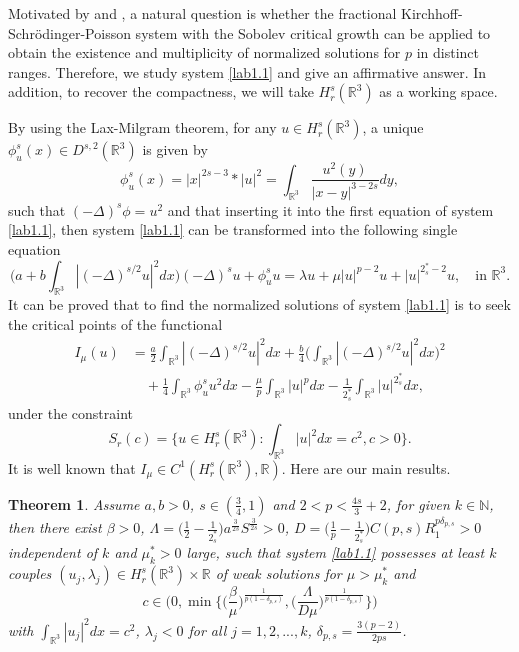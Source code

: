 \documentclass[10pt,a4paper]{amsart}
\numberwithin{equation}{section}
\newtheorem{theorem}{Theorem}[section]
\begin{document}
Motivated by \cite{H2588} and \cite{wang1388}, a natural question is whether the
fractional Kirchhoff-Schr\"odinger-Poisson system with the Sobolev critical growth can
be applied to obtain the  existence and multiplicity   of normalized solutions for $p$
in distinct ranges.
Therefore, we study system \eqref{lab1.1} and give an affirmative answer.
In addition, to recover the compactness, we will take $H^s_r(\mathbb{R}^3)$ as a
working space.

By using the Lax-Milgram theorem, for any $u\in H^s_r(\mathbb{R}^3)$, a unique
$\phi ^s_u(x)\in D^{s,2}(\mathbb{R}^3)$ is given by
\[ \label{lab1.4}
\phi ^s_u(x)=|x|^{2s-3}\ast|u|^2=\int_{\mathbb{R}^3}\frac{u^2(y)}{|x-y|^{3-2s}}dy,
\]
such that $(-\Delta)^s\phi =u^2$ and that inserting it into the first equation of
system \eqref{lab1.1}, then system \eqref{lab1.1} can be transformed into the following
single equation
\begin{equation}\label{lab1.5}
\Big(a+b\int_{\mathbb{R}^3}|(-\Delta)^{s/2}u|^2dx\Big)(-\Delta)^s u
 + \phi^s_u u= \lambda u+ \mu|u|^{p-2}u+ |u|^{2^*_s-2}u, \quad\text{in }\mathbb{R}^3.
\end{equation}
It can be proved  that to find the normalized solutions of system \eqref{lab1.1}
is to seek the critical points of the functional
\begin{align*}
  I_\mu(u)
&=\frac{a}{2}\int_{\mathbb{R}^3}|(-\Delta)^{s/2}u|^2dx
  +\frac{b}{4}\Big(\int_{\mathbb{R}^3}|(-\Delta)^{s/2}u|^2dx\Big)^2\\
&\quad +\frac{1}{4}\int_{\mathbb{R}^3}\phi ^s_uu^2dx
 -\frac{\mu}{p}\int _{\mathbb{R}^3}|u|^pdx
 -\frac{1}{2^*_s}\int _{\mathbb{R}^3}|u|^{2^*_s}dx,
\end{align*}
under the constraint
\[ \label{1.8}
S_r(c)=\Big\{u \in H^s_r(\mathbb{R}^3):\int_{\mathbb{R}^3}|u|^2dx=c^2,c>0\Big\}.
\]
It is well known that $I_\mu\in {C}^1(H^s_r(\mathbb{R}^3), \mathbb{R})$.
Here are our main results.


\begin{theorem}\label{thm1.1}
Assume $a,b>0$, $s\in(\frac{3}{4},1)$ and $2<p<\frac{4s}{3}+2$, for given
$k\in \mathbb{N}$, then there exist $\beta>0$,
$\Lambda=\big(\frac{1}{2}-\frac{1}{2^*_s}\big) a^{\frac{3}{2s}}S^{\frac{3}{2s}}>0$,
$D=\big(\frac{1}{p}-\frac{1}{2^*_s}\big)C(p,s)R_1^{p\delta_{p,s}}>0$ independent of
$k$ and $\mu^*_k>0$ large, such that system \eqref{lab1.1}  possesses at least $k$
couples $(u_j, \lambda_j)\in H^s_r(\mathbb{R}^3)\times \mathbb{R}$ of weak solutions
for $\mu>\mu^*_k$ and
\[  %
c\in\Big(0, \min\Big\{\Big(\frac{\beta}{\mu}\Big)^{\frac{1}{p(1-\delta_{p,s})}},
\Big(\frac{\Lambda}{D\mu}\Big)^{\frac{1}{p(1-\delta_{p,s})}}\Big\}\Big)
\]
with $\int_{\mathbb{R}^3}|u_j|^2dx=c^2$, $\lambda_j<0$ for all $j=1,2,...,k$,
$\delta_{p,s}=\frac{3(p-2)}{2ps}$.
\end{theorem}
\end{document}
